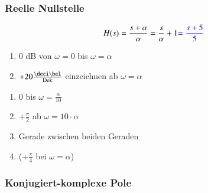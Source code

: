 \subsubsection{Reelle Nullstelle}

\begin{minipage}[t]{0.48\columnwidth}
    $$ H(s) = \frac{s + \alpha}{\alpha} = \frac{s}{\alpha} + 1 {\color{blue}= \frac{s + 5}{5}} $$
    
\end{minipage}
\hfill
\begin{minipage}[t]{0.48\columnwidth}

    \begin{enumerate}
        \item 0 $\text{dB}$ von $\omega=0$ bis $\omega=\alpha$
        \item $+20\frac{\deci \bel}{\Dek}$ einzeichnen ab $\omega = \alpha$\\
    \end{enumerate}

    \begin{enumerate}
        \item $0$ bis $\omega = \frac{\alpha}{10}$
        \item $+\frac{\pi}{2}$ ab $\omega = 10\cdot \alpha$
        \item Gerade zwischen beiden Geraden 
        \item ($+\frac{\pi}{4}$ bei $\omega=\alpha$)
    \end{enumerate}
\end{minipage}
    

\subsubsection{Konjugiert-komplexe Pole}

